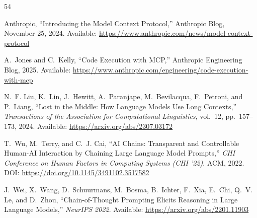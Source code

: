 \documentclass[acmlarge,nonacm,screen]{acmart}
\begin{document}
\begin{thebibliography}{54}

Anthropic,
``Introducing the Model Context Protocol,''
Anthropic Blog, November 25, 2024.
\newline Available: \url{https://www.anthropic.com/news/model-context-protocol}

A.~Jones and C.~Kelly,
``Code Execution with MCP,''
Anthropic Engineering Blog, 2025.
\newline Available: \url{https://www.anthropic.com/engineering/code-execution-with-mcp}


N.~F. Liu, K.~Lin, J.~Hewitt, A.~Paranjape, M.~Bevilacqua, F.~Petroni, and P.~Liang,
``Lost in the Middle: How Language Models Use Long Contexts,''
\textit{Transactions of the Association for Computational Linguistics}, vol.~12, pp.~157--173, 2024.
\newline Available: \url{https://arxiv.org/abs/2307.03172}


T.~Wu, M.~Terry, and C.~J. Cai,
``AI Chains: Transparent and Controllable Human-AI Interaction by Chaining Large Language Model Prompts,''
\textit{CHI Conference on Human Factors in Computing Systems (CHI '22)}. ACM, 2022.
\newline DOI: \url{https://doi.org/10.1145/3491102.3517582}

J.~Wei, X.~Wang, D.~Schuurmans, M.~Bosma, B.~Ichter, F.~Xia, E.~Chi, Q.~V. Le, and D.~Zhou,
``Chain-of-Thought Prompting Elicits Reasoning in Large Language Models,''
\textit{NeurIPS 2022}.
\newline Available: \url{https://arxiv.org/abs/2201.11903}


\end{thebibliography}
\end{document}
